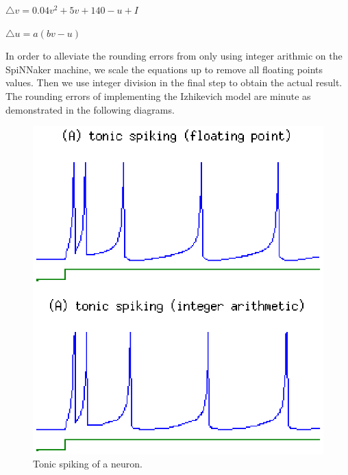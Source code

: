 \documentclass[journal]{./sty/IEEEtran}
\begin{document}
\begin{math}
\triangle v = 0.04 v^2 + 5 v  + 140 - u + I
\end{math}

\begin{math}
\triangle u = a(b v - u)
\end{math}

In order to alleviate the rounding errors from only using integer arithmic on the SpiNNaker machine, 
we scale the equations up to remove all floating points values. 
Then we use integer division in the final step to obtain the actual result.
The rounding errors of implementing the Izhikevich model are minute as demonstrated in the following diagrams.

\begin{figure}
\centering
\includegraphics[scale=0.6]{imgs/izh_tonic}
\caption{Tonic spiking of a neuron.}
\end{figure}
\end{document}
